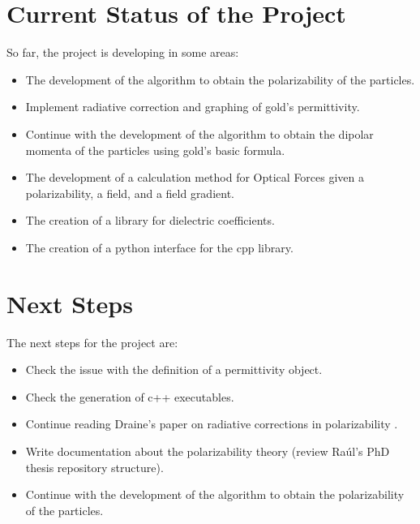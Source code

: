 \documentclass[12pt]{article}
\begin{document}
\section{Current Status of the Project}
So far, the project is developing in some areas:
\begin{itemize}
    \item The development of the algorithm to obtain the polarizability of the particles.
    \item Implement radiative correction and graphing of gold's permittivity.
    \item Continue with the development of the algorithm to obtain the dipolar momenta of the particles using gold's basic formula.
    \item The development of a calculation method for Optical Forces given a polarizability, a field, and a field gradient.
    \item The creation of a library for dielectric coefficients.
    \item The creation of a python interface for the cpp library.
\end{itemize}

\section{Next Steps}
The next steps for the project are:
\begin{itemize}
    \item Check the issue with the definition of a permittivity object.
    \item Check the generation of c++ executables.
    \item Continue reading Draine's paper on radiative corrections in polarizability \cite{Draine1988ApJ...333..848D}.
    \item Write documentation about the polarizability theory (review Raúl's PhD thesis repository structure).
    \item Continue with the development of the algorithm to obtain the polarizability of the particles.
\end{itemize}

\printbibliography
\end{document}
